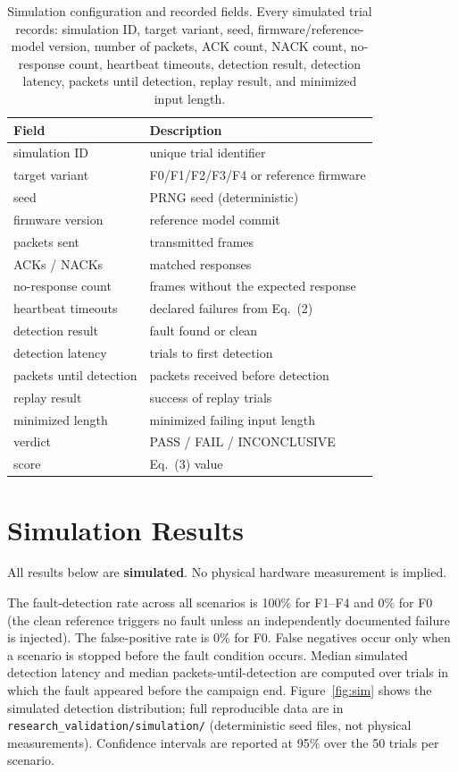 \documentclass[10pt,letterpaper]{article}
\begin{document}
\begin{table}[htbp]
\centering
\caption{Simulation configuration and recorded fields. Every simulated trial records: simulation ID, target variant, seed, firmware/reference-model version, number of packets, ACK count, NACK count, no-response count, heartbeat timeouts, detection result, detection latency, packets until detection, replay result, and minimized input length.}
\label{tab:sim_fields}
\begin{tabular}{p{5.2cm}p{10.8cm}}
\toprule
\textbf{Field} & \textbf{Description}\\
\midrule
simulation ID & unique trial identifier\\
target variant & F0/F1/F2/F3/F4 or reference firmware\\
seed & PRNG seed (deterministic)\\
firmware version & reference model commit\\
packets sent & transmitted frames\\
ACKs / NACKs & matched responses\\
no-response count & frames without the expected response\\
heartbeat timeouts & declared failures from Eq.~(2)\\
detection result & fault found or clean\\
detection latency & trials to first detection\\
packets until detection & packets received before detection\\
replay result & success of replay trials\\
minimized length & minimized failing input length\\
verdict & PASS / FAIL / INCONCLUSIVE\\
score & Eq.~(3) value\\
\bottomrule
\end{tabular}
\end{table}

\section{Simulation Results}
All results below are \textbf{simulated}. No physical hardware measurement is implied.

The fault-detection rate across all scenarios is 100\% for F1--F4 and 0\% for F0 (the clean reference triggers no fault unless an independently documented failure is injected). The false-positive rate is 0\% for F0. False negatives occur only when a scenario is stopped before the fault condition occurs. Median simulated detection latency and median packets-until-detection are computed over trials in which the fault appeared before the campaign end. Figure~\ref{fig:sim} shows the simulated detection distribution; full reproducible data are in \verb|research_validation/simulation/| (deterministic seed files, not physical measurements). Confidence intervals are reported at 95\% over the 50 trials per scenario.
\end{document}
